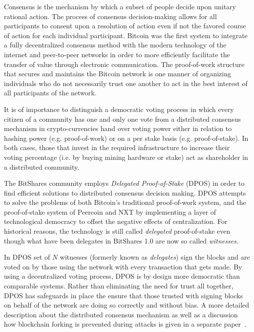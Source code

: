 \label{sec:consensus}

Consensus is the mechanism by which a subset of people decide upon unitary
rational action. The process of consensus decision-making allows for all
participants to consent upon a resolution of action even if not the favored
course of action for each individual participant. Bitcoin was the first system
to integrate a fully decentralized consensus method with the modern technology
of the internet and peer-to-peer networks in order to more efficiently
facilitate the transfer of value through electronic communication. The
proof-of-work structure that secures and maintains the Bitcoin network is one
manner of organizing individuals who do not necessarily trust one another to
act in the best interest of all participants of the network.

It is of importance to distinguish a democratic voting process in which every
citizen of a community has one and only one vote from a distributed consensus
mechanism in crypto-currencies hand over voting power either in relation to
hashing power (e.g. proof-of-work) or on a per stake basis (e.g.
proof-of-stake). In both cases, those that invest in the required
infrastructure to increase their voting percentage (i.e. by buying mining
hardware or stake) act as shareholder in a distributed community.

The BitShares community employs \emph{Delegated Proof-of-Stake} (DPOS) in order
to find efficient solutions to distributed consensus decision making.  DPOS
attempts to solve the problems of both Bitcoin's traditional proof-of-work
system, and the proof-of-stake system of Peercoin and NXT by implementing a
layer of technological democracy to offset the negative effects of
centralization. For historical reasons, the technology is still called
\emph{delegated} proof-of-stake even though what have been delegates in
BitShares 1.0 are now so called \emph{witnesses}.

In DPOS set of $N$ witnesses (formerly known as \emph{delegates}) sign the
blocks and are voted on by those using the network with every transaction that
gets made. By using a decentralized voting process, DPOS is by design more
democratic than comparable systems. Rather than eliminating the need for trust
all together, DPOS has safeguards in place the ensure that those trusted with
signing blocks on behalf of the network are doing so correctly and without
bias. A more detailed description about the distributed consensus mechanism as
well as a discussion how blockchain forking is prevented during attacks is
given in a separate paper~\cite{}. %

